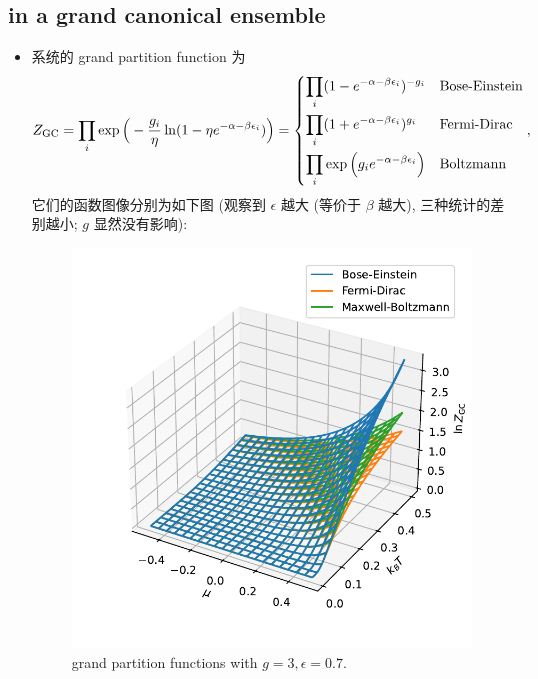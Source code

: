 \subsection{in a grand canonical ensemble}
\begin{itemize}
	\item 系统的 grand partition function 为
	\begin{equation} \label{6.1.10}
		Z_\text{GC} = \prod_i \exp \Big( - \frac{g_i}{\eta} \ln(1 - \eta e^{- \alpha - \beta \epsilon_i}) \Big) = \begin{dcases}
			\prod_i (1 - e^{- \alpha - \beta \epsilon_i})^{- g_i} & \text{Bose-Einstein} \\
			\prod_i (1 + e^{- \alpha - \beta \epsilon_i})^{g_i} & \text{Fermi-Dirac} \\
			\prod_i \exp \Big( g_i e^{- \alpha - \beta \epsilon_i} \Big) & \text{Boltzmann}
		\end{dcases},
	\end{equation}
	它们的函数图像分别为如下图 (观察到 $\epsilon$ 越大 (等价于 $\beta$ 越大), 三种统计的差别越小; $g$ 显然没有影响):
	
	\begin{figure}[H]
		\centering
		\includegraphics[scale=0.75]{figures/grand partition functions with g = 3, epsilon = 0.7.pdf}
		\caption{grand partition functions with $g = 3, \epsilon = 0.7$.}
	\end{figure}
	

\end{itemize}
